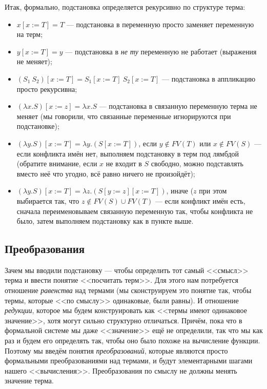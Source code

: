 \documentclass{../../text-style}
\begin{document}
Итак, формально, подстановка определяется рекурсивно по структуре терма:

\begin{itemize}
    \item $x[x := T] = T$ --- подстановка в переменную просто заменяет переменную на терм;
    \item $y[x := T] = y$ --- подстановка в \textit{не ту} переменную не работает (выражения не меняет);
    \item $(S_1\ S_2)[x := T] = S_1[x := T]\ S_2[x := T]$ --- подстановка в аппликацию просто рекурсивна;
    \item $(\lambda x.S)[x := z] = \lambda x.S$ --- подстановка в связанную переменную терма не меняет (мы говорили, что связанные переменные игнорируются при подстановке);
    \item $(\lambda y.S)[x := T] = \lambda y.(S[x := T])$, если $y \notin FV(T)$ или $x \notin FV(S)$ --- если конфликта имён нет, выполняем подстановку в терм под лямбдой (обратите внимание, если $x$ не входит в $S$ свободно, можно подставлять вместо неё что угодно, всё равно ничего не произойдёт);
    \item $(\lambda y.S)[x := T] = \lambda z.(S[y := z][x := T])$, иначе ($z$ при этом выбирается так, что $z \notin FV(S) \cup FV(T)$ --- если конфликт имён есть, сначала переименовываем связанную переменную так, чтобы конфликта не было, затем выполняем подстановку как в пункте выше.
\end{itemize}

\subsection{Преобразования}

Зачем мы вводили подстановку --- чтобы определить тот самый <<смысл>> терма и ввести понятие <<посчитать терм>>. Для этого нам потребуется отношение \textit{равенства} над термами (мы сконструируем это понятие так, чтобы термы, которые <<по смыслу>> одинаковые, были равны). И отношение \textit{редукции}, которое мы будем конструировать как <<термы имеют одинаковое значение>>, хотя могут сильно структурно отличаться. Причём, пока что в формальной системе мы даже <<значение>> ещё не определили, так что мы как раз и будем его определять так, чтобы оно было похоже на вычисление функции. Поэтому мы введём понятия \textit{преобразований}, которые являются просто формальными преобразованиями над термами, и будут элементарными шагами нашего <<вычисления>>. Преобразования по смыслу не должны менять значение терма.
\end{document}
